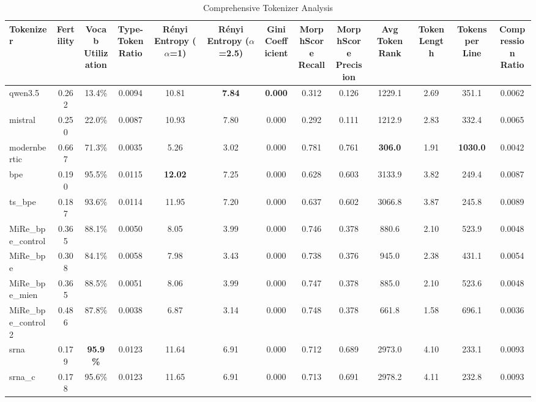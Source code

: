 \begin{table}[htbp]
\centering
\caption{Comprehensive Tokenizer Analysis}
\label{tab:comprehensive_metrics}
\begin{tabular}{lcccccccccccc}
\toprule
Tokenizer & Fertility & \makecell{Vocab \\ Utilization} & \makecell{Type-Token \\ Ratio} & \makecell{Rényi Entropy \\ ($\alpha$=1)} & \makecell{Rényi Entropy \\ ($\alpha$=2.5)} & \makecell{Gini \\ Coefficient} & \makecell{MorphScore \\ Recall} & \makecell{MorphScore \\ Precision} & Avg Token Rank & Token Length & Tokens per Line & \makecell{Compression \\ Ratio} \\
\midrule
qwen3.5 & 0.262 & 13.4\% & 0.0094 & 10.81 & \textbf{7.84} & \textbf{0.000} & 0.312 & 0.126 & 1229.1 & 2.69 & 351.1 & 0.0062 \\
mistral & 0.250 & 22.0\% & 0.0087 & 10.93 & 7.80 & 0.000 & 0.292 & 0.111 & 1212.9 & 2.83 & 332.4 & 0.0065 \\
modernbertic & 0.667 & 71.3\% & 0.0035 & 5.26 & 3.02 & 0.000 & 0.781 & 0.761 & \textbf{306.0} & 1.91 & \textbf{1030.0} & 0.0042 \\
bpe & 0.190 & 95.5\% & 0.0115 & \textbf{12.02} & 7.25 & 0.000 & 0.628 & 0.603 & 3133.9 & 3.82 & 249.4 & 0.0087 \\
ts\_bpe & 0.187 & 93.6\% & 0.0114 & 11.95 & 7.20 & 0.000 & 0.637 & 0.602 & 3066.8 & 3.87 & 245.8 & 0.0089 \\
MiRe\_bpe\_control & 0.365 & 88.1\% & 0.0050 & 8.05 & 3.99 & 0.000 & 0.746 & 0.378 & 880.6 & 2.10 & 523.9 & 0.0048 \\
MiRe\_bpe & 0.308 & 84.1\% & 0.0058 & 7.98 & 3.43 & 0.000 & 0.738 & 0.376 & 945.0 & 2.38 & 431.1 & 0.0054 \\
MiRe\_bpe\_mien & 0.365 & 88.5\% & 0.0051 & 8.06 & 3.99 & 0.000 & 0.747 & 0.378 & 885.0 & 2.10 & 523.6 & 0.0048 \\
MiRe\_bpe\_control2 & 0.486 & 87.8\% & 0.0038 & 6.87 & 3.14 & 0.000 & 0.748 & 0.378 & 661.8 & 1.58 & 696.1 & 0.0036 \\
srna & 0.179 & \textbf{95.9\%} & 0.0123 & 11.64 & 6.91 & 0.000 & 0.712 & 0.689 & 2973.0 & 4.10 & 233.1 & 0.0093 \\
srna\_c & 0.178 & 95.6\% & 0.0123 & 11.65 & 6.91 & 0.000 & 0.713 & 0.691 & 2978.2 & 4.11 & 232.8 & 0.0093 \\

\end{tabular}
\end{table}

